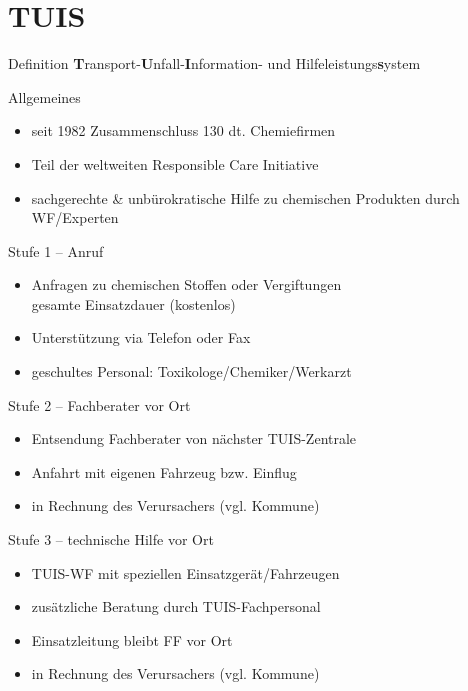 \section{TUIS}
\begin{warningbox}{Definition}
    \textbf{T}ransport-\textbf{U}nfall-\textbf{I}nformation- und Hilfeleistungs\textbf{s}ystem
\end{warningbox}
\begin{sectionbox}{Allgemeines}
    \begin{itemize}
        \item seit 1982 Zusammenschluss 130 dt. Chemiefirmen
        \item Teil der weltweiten Responsible Care Initiative
        \item sachgerechte \& unbürokratische Hilfe zu chemischen Produkten durch WF/Experten
    \end{itemize}
\end{sectionbox}
\begin{sectionbox}{Stufe 1 -- Anruf}
    \begin{itemize}
        \item Anfragen zu chemischen Stoffen oder Vergiftungen\\
        \ra gesamte Einsatzdauer (kostenlos)
        \item Unterstützung via Telefon oder Fax
        \item geschultes Personal: Toxikologe/Chemiker/Werkarzt
    \end{itemize}
\end{sectionbox}
\begin{sectionbox}{Stufe 2 -- Fachberater vor Ort}
    \begin{itemize}
        \item Entsendung Fachberater von nächster TUIS-Zentrale
        \item Anfahrt mit eigenen Fahrzeug bzw. Einflug
        \item in Rechnung des Verursachers (vgl. Kommune)
    \end{itemize}
\end{sectionbox}
\begin{sectionbox}{Stufe 3 -- technische Hilfe vor Ort}
    \begin{itemize}
        \item TUIS-WF mit speziellen Einsatzgerät/Fahrzeugen
        \item zusätzliche Beratung durch TUIS-Fachpersonal
        \item Einsatzleitung bleibt FF vor Ort
        \item in Rechnung des Verursachers (vgl. Kommune)
    \end{itemize}
\end{sectionbox}
